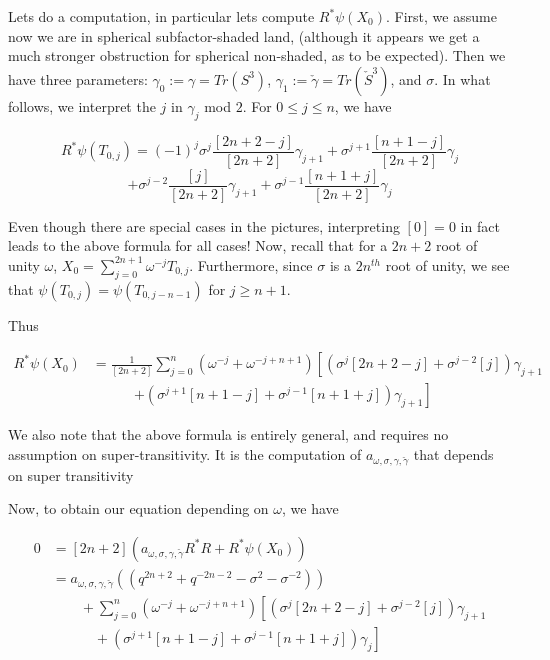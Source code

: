 \documentclass[12pt]{article}
\begin{document}
\bigskip

Lets do a computation,  in particular lets compute $R^{*}\psi(X_0)$.  First, we assume now we are in spherical subfactor-shaded land, (although it appears we get a much stronger obstruction for spherical non-shaded, as to be expected).  Then we have three parameters: $\gamma_{0}:=\gamma=Tr(S^{3})$,  $\gamma_{1}:=\check{\gamma}=Tr(\check{S}^{3})$, and $\sigma$.  In what follows, we interpret the $j$ in $\gamma_{j}$ mod $2$. For $0\le j\le n$, we have

$$R^{*}\psi(T_{0,j})=(-1)^{j}\sigma^{j}\frac{[2n+2-j]}{[2n+2]} \gamma_{j+1}+\sigma^{j+1}\frac{[n+1-j]}{[2n+2]} \gamma_{j}$$
$$+\sigma^{j-2}\frac{[j]}{[2n+2]} \gamma_{j+1}+\sigma^{j-1}\frac{[n+1+j]}{[2n+2]} \gamma_{j}$$

Even though there are special cases in the pictures, interpreting $[0]=0$ in fact leads to the above formula for all cases!  Now, recall that for a $2n+2$ root of unity $\omega$, $X_{0}=\sum^{2n+1}_{j=0} \omega^{-j}T_{0,j}$.  Furthermore, since $\sigma$ is a $2n^{th}$ root of unity, we see that $\psi(T_{0,j})=\psi(T_{0,j-n-1})$ for $j\ge n+1$.

Thus 

\begin{align*}
R^{*}\psi(X_0) & = \frac{1}{[2n+2]} \sum^{n}_{j=0}(\omega^{-j}+\omega^{-j+n+1})\left[  \left(\sigma^{j}[2n+2-j]
+\sigma^{j-2}[j]\right) \gamma_{j+1}
\right. \\
& \qquad \quad
\left. + \left( \sigma^{j+1}[n+1-j]+\sigma^{j-1}[n+1+j] \right)\gamma_{j+1}\right]
\end{align*}


We also note that the above formula is entirely general, and requires no assumption on super-transitivity.  It is the computation of $a_{\omega, \sigma, \gamma, \check{\gamma}}$ that depends on super transitivity

Now, to obtain our equation depending on $\omega$, we have

\begin{align*}
0 & = [2n+2]\left( a_{\omega, \sigma, \gamma, \check{\gamma}} R^{*}R+R^{*}\psi(X_0) \right) \\
  & = a_{\omega, \sigma, \gamma, \check{\gamma}}((q^{2n+2}+q^{-2n-2}-\sigma^{2}-\sigma^{-2})) \\
  & \qquad + \sum^{n}_{j=0}(\omega^{-j}+\omega^{-j+n+1})\left[ \left(\sigma^{j}[2n+2-j] +\sigma^{j-2}[j]\right) \gamma_{j+1}
\right. \\
 &  \qquad \quad + \left. \left( \sigma^{j+1}[n+1-j]+\sigma^{j-1}[n+1+j] \right)\gamma_{j}\right]
\end{align*}
\end{document}

